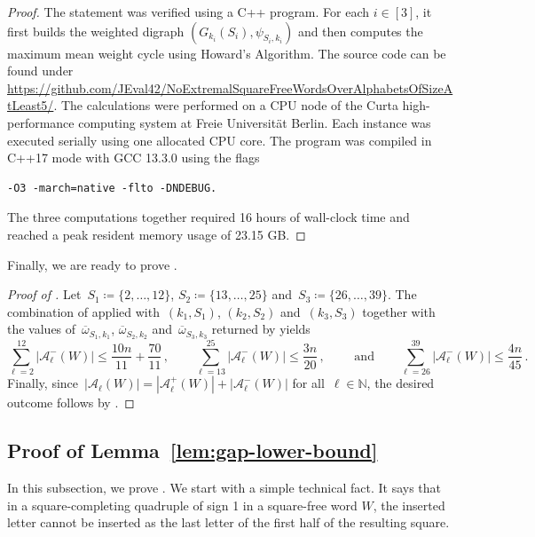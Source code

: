 \documentclass[12pt]{article}
\theoremstyle{plain}
\theoremstyle{definition}
\newcommand\N{\mathbb{N}}
\newcommand{\coleq}{\coloneq}
\newcommand{\cA}{\mathcal A}
\newcommand{\bwp}[2]{\overline\omega_{#1,#2}}
\newcommand{\abs}[1]{\mathopen{}\left\lvert#1\right\rvert\mathclose{}}
\begin{document}
	\begin{proof}
		The statement was verified using a C++ program. For each $i\in[3]$, it first builds the weighted digraph $(G_{k_i}(S_i),\psi_{S_i,k_i})$ and then computes the maximum mean weight cycle using Howard's Algorithm. The source code can be found under \url{https://github.com/JEval42/NoExtremalSquareFreeWordsOverAlphabetsOfSizeAtLeast5/}. The calculations were performed on a CPU node of the Curta high-performance computing system at Freie Universität Berlin. Each instance was executed serially using one allocated CPU core. The program was compiled in C++17 mode with GCC 13.3.0 using the flags 
		\begin{verbatim}-O3 -march=native -flto -DNDEBUG.\end{verbatim} 
		The three computations together required 16 hours of wall-clock time and reached a peak resident memory usage of 23.15 GB.
	\end{proof}
	
	Finally, we are ready to prove .
	
	\begin{proof}[Proof of ]
		Let~$S_1\coleq\{2,\dots,12\}$, $S_2\coleq\{13,\dots,25\}$ and~$S_3\coleq\{26,\dots,39\}$. The combination of  applied with~$(k_1,S_1)$, $(k_2,S_2)$ and~$(k_3,S_3)$ together with the values of~$\bwp{S_1}{k_1}$, $\bwp{S_2}{k_2}$ and~$\bwp{S_3}{k_3}$ returned by  yields
		\[\sum_{\ell=2}^{12}\abs{\cA^{-}_{\ell}(W)}\le \frac{10n}{11}+\frac{70}{11}\,, \qquad \sum_{\ell=13}^{25}\abs{\cA^{-}_{\ell}(W)}\le \frac{3n}{20}\,,\qquad \textrm{ and} \qquad \sum_{\ell=26}^{39}\abs{\cA^{-}_{\ell}(W)} \le \frac{4n}{45}\,.\]
		Finally, since~$\abs{\cA_\ell(W)}=\abs{\cA^{+}_\ell(W)}+\abs{\cA^{-}_\ell(W)}$ for all~$\ell\in\N$, the desired outcome follows by .
	\end{proof}
	
	\subsection{Proof of Lemma~\ref{lem:gap-lower-bound}} \label{ssec:proof-gap-lower-bound}
	
	In this subsection, we prove . We start with a simple technical fact. It says that in a square-completing quadruple of sign 1 in a square-free word $W$, the inserted letter cannot be inserted as the last letter of the first half of the resulting square. 
	
\end{document}
